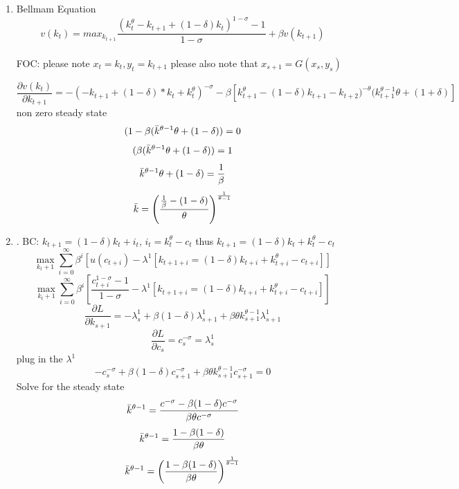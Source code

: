 \begin{enumerate}
    \item  Bellmam Equation $$v(k_t)= max_{k_{t+1}} \frac{(k_t^\theta -k_{t+1}+(1-\delta)k_t)^{1-\sigma}-1}{1-\sigma}+\beta v(k_{t+1})$$\\
    FOC: please note $x_t=k_t, y_t=k_{t+1}$ please also note that $x_{s+1}=G(x_s,y_s)$
    
    $$\frac{\partial v(k_t)}{\partial k_{t+1}}=-( -k_{t+1} + (1-\delta)*k_t +k_t^\theta)^{-\sigma}
   -\beta[k_{t+1}^\theta-(1-\delta)k_{t+1}-k_{t+2})^{-\theta}(k^{\theta-1}_{t+1}\theta+(1+\delta)]$$
   non zero steady state 
   $$(1-\beta(\Bar{k}^{\theta-1}\theta+(1-\delta))=0$$
   $$(\beta(\Bar{k}^{\theta-1}\theta+(1-\delta))=1$$
   $$\Bar{k}^{\theta-1}\theta+(1-\delta)=\frac{1}{\beta}$$
   $$\Bar{k}=\left( \frac{\frac{1}{\beta}-(1-\delta)}{\theta}\right) ^{\frac{1}{\theta-1}}$$
   \item. BC: $k_{t+1} =(1-\delta)k_t+i_t$, $i_t=k_t^\theta-c_t$ thus $k_{t+1}=(1-\delta)k_t+k_t^\theta-c_t$
   $$\max_{k_t+1} \sum^\infty_{i=0} \beta^i[u(c_{t+i})-\lambda^1[k_{t+1+i}=(1-\delta)k_{t+i}+k_{t+i}^\theta-c_{t+i}]]$$
   $$\max_{k_t+1} \sum^\infty_{i=0} \beta^i[\frac{c_{t+i}^{1-\sigma}-1}{1-\sigma}-\lambda^1[k_{t+1+i}=(1-\delta)k_{t+i}+k_{t+i}^\theta-c_{t+i}]]$$
   $$\frac{\partial L}{\partial k_{s+1}}= -\lambda^1_s+\beta(1-\delta)\lambda^1_{s+1}+\beta \theta k^{\theta-1}_{s+1}\lambda^1_{s+1}$$
   $$\frac{\partial L}{\partial c_s}= c_s^{-\sigma}=\lambda^1_s$$
   plug in the $\lambda^1$ 
   $$-c_s^{-\sigma}+\beta(1-\delta)c_{s+1}^{-\sigma}+\beta \theta k_{s+1}^{\theta -1} c_{s+1}^{-\sigma}=0$$
   Solve for the steady state 
   $$\Bar{k}^{\theta-1}=\frac{ c^{-\sigma} -\beta(1-\delta)c^{-\sigma}}{\beta \theta c^{-\sigma}}$$
   $$\Bar{k}^{\theta-1}=\frac{1 -\beta(1-\delta)}{\beta \theta}$$
   $$\Bar{k}^{\theta-1}=\left (\frac{1 -\beta(1-\delta)}{\beta \theta} \right )^{\frac{1}{\theta-1}}$$


\end{enumerate}
